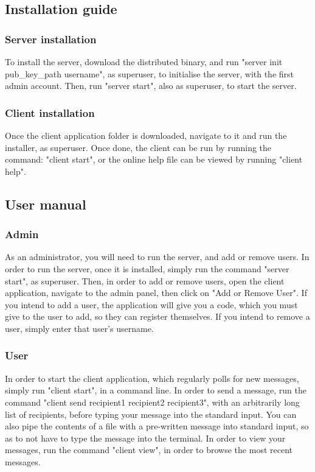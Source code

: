 \documentclass{article}
\begin{document}
\subsection{Installation guide}
\subsubsection{Server installation}
To install the server, download the distributed binary, and run "server init pub\_key\_path username", as superuser, to initialise the server, with the first admin account. Then, run "server start", also as superuser, to start the server.
\subsubsection{Client installation}
Once the client application folder is downloaded, navigate to it and run the installer, as superuser. Once done, the client can be run by running the command: "client start", or the online help file can be viewed by running "client help".
\subsection{User manual}
\subsubsection{Admin}
As an administrator, you will need to run the server, and add or remove users. In order to run the server, once it is installed, simply run the command "server start", as superuser. Then, in order to add or remove users, open the client application, navigate to the admin panel, then click on "Add or Remove User". If you intend to add a user, the application will give you a code, which you must give to the user to add, so they can register themselves. If you intend to remove a user, simply enter that user's username.
\subsubsection{User}
In order to start the client application, which regularly polls for new messages, simply run "client start", in a command line. In order to send a message, run the command "client send recipient1 recipient2 recipient3", with an arbitrarily long list of recipients, before typing your message into the standard input. You can also pipe the contents of a file with a pre-written message into standard input, so as to not have to type the message into the terminal. In order to view your messages, run the command "client view", in order to browse the most recent messages.
\end{document}
